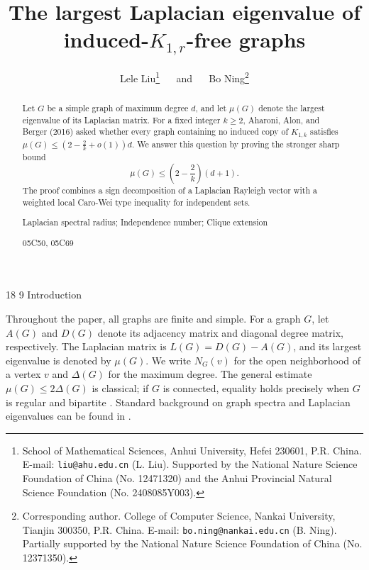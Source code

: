 \documentclass[11pt]{article}
\title{The largest Laplacian eigenvalue of induced-$K_{1,r}$-free graphs}
\author{Lele Liu\footnote{School of Mathematical Sciences, Anhui University, Hefei 230601, 
P.R. China. E-mail: \texttt{liu@ahu.edu.cn} (L. Liu). Supported by the National
Nature Science Foundation of China (No. 12471320) and the Anhui Provincial Natural Science Foundation (No. 2408085Y003).}
~~ and ~~
Bo Ning\footnote{Corresponding author. College of Computer Science, Nankai University, Tianjin 300350, P.R. China.
E-mail: \texttt{bo.ning@nankai.edu.cn} (B. Ning). Partially supported by the National Nature Science
Foundation of China (No. 12371350).}}
\date{}
\makeatletter
\renewcommand\section{\@startsection{section}{1}{\z@}%
{18\p@ \@plus 6\p@ \@minus 3\p@}%
{9\p@ \@plus 6\p@ \@minus 3\p@}%
{\large\bfseries\boldmath}}
\theoremstyle{plain}
\theoremstyle{definition}
\numberwithin{equation}{section}
\makeatother
\begin{document}
\maketitle

\begin{abstract}
Let $G$ be a simple graph of maximum degree $d$, and let
$\mu(G)$ denote the largest eigenvalue of its Laplacian matrix. 
For a fixed integer $k\geq 2$, Aharoni,
Alon, and Berger (2016) asked whether every graph containing no induced copy of
$K_{1,k}$ satisfies
$\mu(G)\leq (2 - \frac{2}{k} + o(1)) d$.
We answer this question by proving the stronger sharp bound
\[
\mu(G)\leq \left(2-\frac{2}{k}\right)(d+1).
\]
The proof combines a sign decomposition of a Laplacian Rayleigh vector with a 
weighted local Caro-Wei type inequality for independent sets.
\par\vspace{2mm}

 Laplacian spectral radius; Independence number; Clique extension
\par\vspace{2mm}

 05C50, 05C69
\end{abstract}

\section{Introduction}

Throughout the paper, all graphs are finite and simple. For a graph $G$, let $A(G)$
and $D(G)$ denote its adjacency matrix and diagonal degree matrix, respectively.
The Laplacian matrix is $L(G)=D(G)-A(G)$, and its largest eigenvalue is denoted 
by $\mu(G)$. We write $N_G(v)$ for the open neighborhood of a vertex $v$ and 
$\Delta(G)$ for the maximum degree. The general estimate
$\mu(G)\leq 2\Delta(G)$
is classical; if $G$ is connected, equality holds precisely when $G$ is
regular and bipartite \cite{AndersonMorley}. Standard background on graph
spectra and Laplacian eigenvalues can be found in \cite{BrouwerHaemers}.
\end{document}
